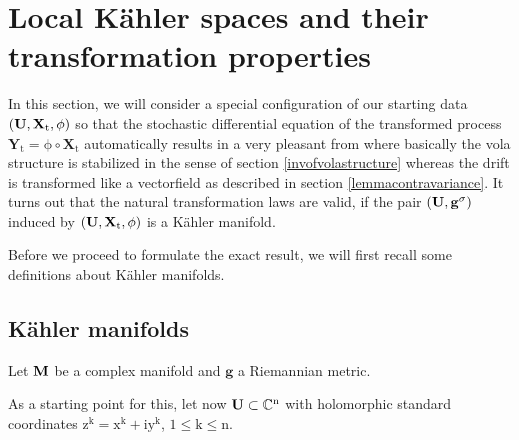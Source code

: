 \documentclass[10 pt,english]{smfart}
\newcommand{\Xt}{\mathrm{\mathbf{X}}_{t}}
\newcommand{\Yt}{\mathrm{\mathbf{Y}}_{t}}
\newcommand{\g}{\mathrm{\mathbf{g}}}
\newcommand{\U}{{\bf{U}}}
\newcommand{\M}{{\bf{M}}}
\begin{document}
\section{Local K\"ahler spaces and their transformation properties}

In this section, we will consider a special configuration of our starting data $\mathrm{(\U,\Xt,\phi)}$ so that the stochastic differential equation of the transformed process $\mathrm{\Yt=\phi\circ \Xt}$ automatically results in a very pleasant from where basically the vola structure is stabilized in the sense of section \ref{invofvolastructure} whereas the drift is transformed like a vectorfield as described in section \ref{lemmacontravariance}. It turns out that the natural transformation laws are valid, if the pair $\mathrm{(\U, \g^{\sigma})}$ induced by $\mathrm{(\U,\Xt,\phi)}$ is a K\"ahler manifold.

Before we proceed to formulate the exact result, we will first recall some definitions about K\"ahler manifolds.

\subsection{K\"ahler manifolds}
Let $\mathrm{\M}$ be a complex manifold and $\mathrm{\g}$ a Riemannian metric.


As a starting point for this, let now $\mathrm{\U \subset \mathbb{C}^{n}}$ with holomorphic standard coordinates $\mathrm{z^{k}=x^{k}+i y^{k}}$, $\mathrm{1\leq k\leq n}$. 
\end{document}
